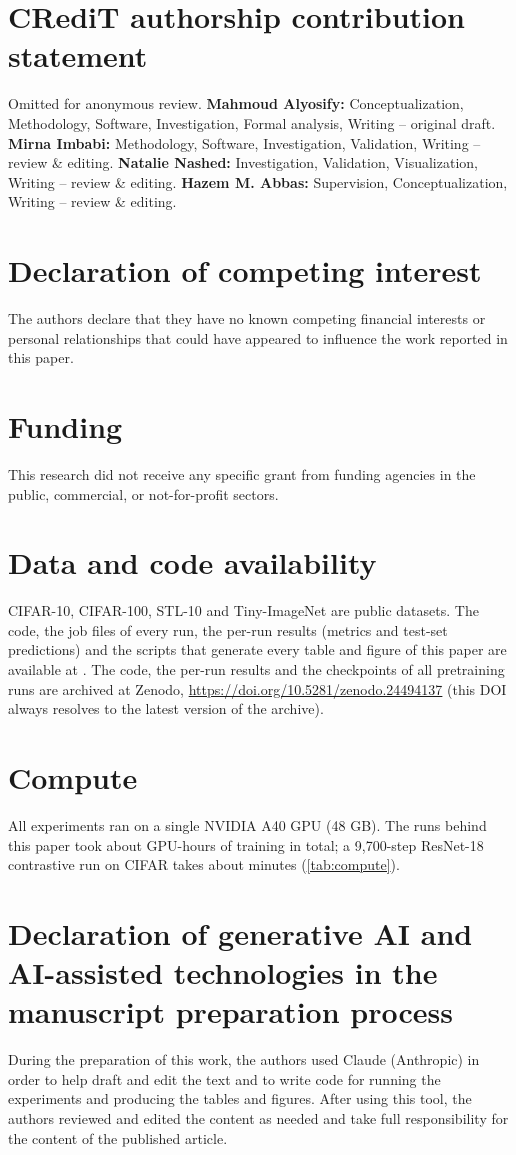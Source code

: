 \section*{CRediT authorship contribution statement}
\ifanon
Omitted for anonymous review.
\else
\textbf{Mahmoud Alyosify:} Conceptualization, Methodology, Software, Investigation, Formal analysis,
Writing -- original draft. \textbf{Mirna Imbabi:} Methodology, Software, Investigation, Validation, Writing --
review \& editing. \textbf{Natalie Nashed:} Investigation, Validation, Visualization, Writing -- review \&
editing. \textbf{Hazem M. Abbas:} Supervision, Conceptualization, Writing -- review \& editing.
\fi

\section*{Declaration of competing interest}
The authors declare that they have no known competing financial interests or personal relationships that
could have appeared to influence the work reported in this paper.

\section*{Funding}
This research did not receive any specific grant from funding agencies in the public, commercial, or
not-for-profit sectors.

\section*{Data and code availability}
CIFAR-10, CIFAR-100, STL-10 and Tiny-ImageNet are public datasets. The code, the job files of every run, the per-run
results (metrics and test-set predictions) and the scripts that generate every table and figure of this
paper are available at \repo. The code, the per-run results and the checkpoints of all pretraining runs are
archived at Zenodo, \url{https://doi.org/10.5281/zenodo.24494137} (this DOI always resolves to the latest
version of the archive).

\section*{Compute}
All experiments ran on a single NVIDIA A40 GPU (48 GB). The  runs behind this paper took about
 GPU-hours of training in total; a 9,700-step ResNet-18 contrastive run on CIFAR takes about
 minutes (\cref{tab:compute}).

\section*{Declaration of generative AI and AI-assisted technologies in the manuscript preparation process}
During the preparation of this work, the authors used Claude (Anthropic) in order to help draft and edit the
text and to write code for running the experiments and producing the tables and figures. After using this
tool, the authors reviewed and edited the content as needed and take full responsibility for the content of
the published article.
